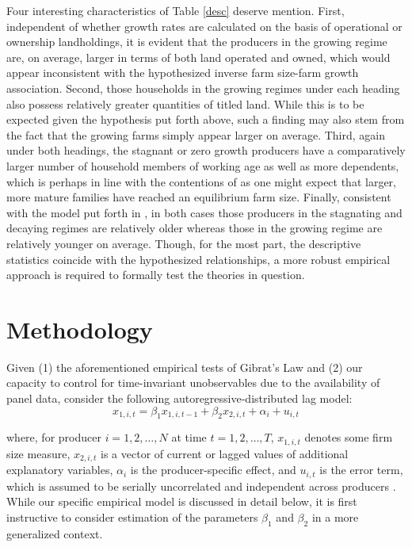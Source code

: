 \documentclass[english]{article}
\begin{document}
Four interesting characteristics of Table \ref{desc} deserve mention. First, independent of whether growth rates are calculated on the basis of operational or ownership landholdings, it is evident that the producers in the growing regime are, on average, larger in terms of both land operated and owned, which would appear inconsistent with the hypothesized inverse farm size-farm growth association. Second, those households in the growing regimes under each heading also possess relatively greater quantities of titled land. While this is to be expected given the hypothesis put forth above, such a finding may also stem from the fact that the growing farms simply appear larger on average. Third, again under both headings, the stagnant or zero growth producers have a comparatively larger number of household members of working age as well as more dependents, which is perhaps in line with the contentions of \citet{chayanov1966} as one might expect that larger, more mature families have reached an equilibrium farm size. Finally, consistent with the model put forth in \citet{jovanovic1982}, in both cases those producers in the stagnating and decaying regimes are relatively older whereas those in the growing regime are relatively younger on average. Though, for the most part, the descriptive statistics coincide with the hypothesized relationships, a more robust empirical approach is required to formally test the theories in question.


\section{Methodology}
\label{sec: methodology}

Given (1) the aforementioned empirical tests of Gibrat's Law and (2) our capacity to control for time-invariant unobservables due to the availability of panel data, consider the following autoregressive-distributed lag model: 
\begin{equation}
x_{1,i,t} = \beta_1 x_{1,i,t-1} + \beta_2 x_{2,i,t} + \alpha_i +  u_{i,t}
\label{adl}
\end{equation}

\noindent
where, for producer $i=1,2,\ldots,N$ at time $t=1,2,\ldots,T$, $x_{1,i,t}$ denotes some firm size measure, $x_{2,i,t}$ is a vector of current or lagged values of additional explanatory variables, $\alpha_i$ is the producer-specific effect, and $u_{i,t}$ is the error term, which is assumed to be serially uncorrelated and independent across producers \citep{bond2002}. While our specific empirical model is discussed in detail below, it is first instructive to consider estimation of the parameters $\beta_1$ and $\beta_2$ in a more generalized context.
\end{document}
